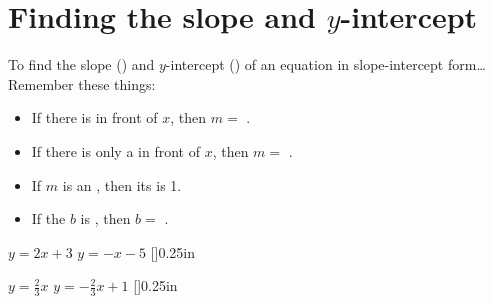 \section{Finding the slope and $y$-intercept}

\begin{myConcept}{%
        To find the slope () 
        and $y$-intercept () 
        of an equation in slope-intercept form\dots
    }
    Remember these things:
    \begin{itemize}
        \item If there is  in front of $x$, then $m = $ .
        \item If there is only a  in front of $x$, then $m = $ .
        \item If $m$ is an , then its  is 1.
        \item If the $b$ is , then $b = $ .
    \end{itemize}
\end{myConcept}


\myProblems%
{
    $y = 2x + 3$
}
{
    $y = -x - 5$   
}[\normalsize]{0.25in}

\myProblems
{
    $y = \frac{2}{3}x$   
}
{
    $y = -\frac{2}{3}x + 1$   
}[\normalsize]{0.25in}
